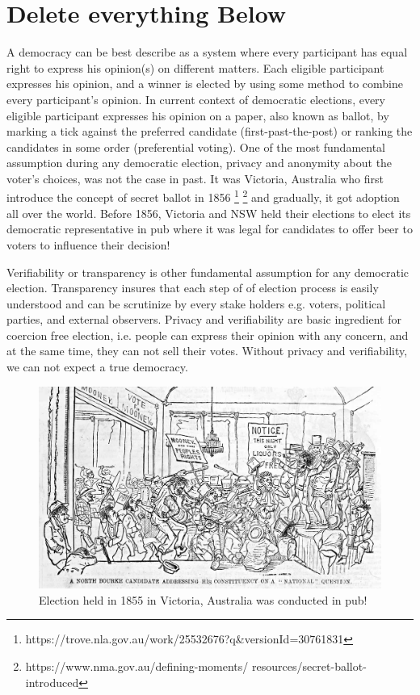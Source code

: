   





\section{Delete everything Below}


A democracy can be best describe as a system where every participant 
has equal right to express his opinion(s) on different matters. Each
eligible participant expresses his opinion, and a winner is elected 
by using some method to combine every participant's opinion.
In current context of democratic elections, 
every eligible participant expresses his opinion on a paper, also 
known as ballot, 
by marking a tick against the preferred candidate 
(first-past-the-post) or ranking the candidates in some order
(preferential voting). 
One of the most fundamental assumption during any democratic 
election, privacy and anonymity about the voter's choices, was not the case 
in past. It was Victoria, Australia who first introduce the 
concept of secret ballot in 1856 \footnote{
 https://trove.nla.gov.au/work/25532676?q\&versionId=30761831}
 \footnote{https://www.nma.gov.au/defining-moments/
	  resources/secret-ballot-introduced} and gradually, it 
	  got adoption all over the world. Before 1856, Victoria
	  and NSW held their elections to elect its 
	  democratic representative in pub where it was legal for 
	  candidates to offer beer to voters to influence their 
	  decision! 
	  
Verifiability or transparency is other fundamental assumption for 
any democratic election. Transparency insures that each step of 
of election process is easily understood and can be scrutinize by 
every stake holders e.g. voters, political parties, and external 
observers. Privacy and verifiability  are basic 
ingredient for coercion free election, i.e. people 
can express their opinion with any concern, and at the same time,
they can not sell their votes. Without privacy and verifiability, 
we can not expect a true democracy.   

 
 \begin{figure}[htb]
	\begin{center}
	\includegraphics[scale=0.25]{NorthBourke.jpg}
	\caption{Election held in 1855 in Victoria, Australia 
	  was conducted in pub!}
	\end{center}
  \end{figure}   
  
